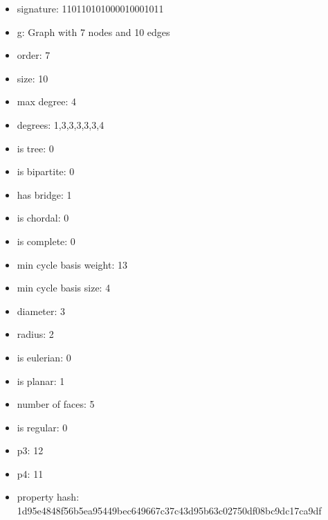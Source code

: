 \begin{itemize}
\item signature: 110110101000010001011
\item g: Graph with 7 nodes and 10 edges
\item order: 7
\item size: 10
\item max degree: 4
\item degrees: 1,3,3,3,3,3,4
\item is tree: 0
\item is bipartite: 0
\item has bridge: 1
\item is chordal: 0
\item is complete: 0
\item min cycle basis weight: 13
\item min cycle basis size: 4
\item diameter: 3
\item radius: 2
\item is eulerian: 0
\item is planar: 1
\item number of faces: 5
\item is regular: 0
\item p3: 12
\item p4: 11
\item property hash: 1d95e4848f56b5ea95449bec649667c37c43d95b63c02750df08bc9dc17ca9df
\end{itemize}
\newpage
\begin{figure}
\end{figure}
